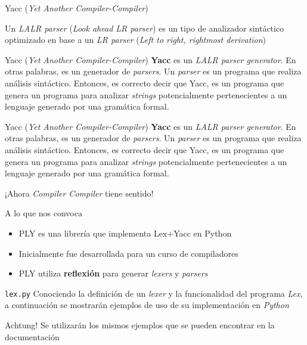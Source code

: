 \documentclass[pdf]{beamer}
\begin{document}
	\begin{frame}{Yacc (\emph{Yet Another Compiler-Compiler})}
		\begin{definition}
			Un \emph{LALR parser} (\emph{Look ahead LR parser}) es un tipo de analizador sintáctico optimizado en base a un \emph{LR parser} (\emph{Left to right, rightmost derivation})
		\end{definition}
	\end{frame}
	
	\begin{frame}{Yacc (\emph{Yet Another Compiler-Compiler})}
		\textbf{Yacc} es un \emph{LALR parser generator}. En otras palabras, es un generador de \emph{parsers}. Un \emph{parser} es un programa que realiza análisis sintáctico. Entonces, es correcto decir que Yacc, es un programa que genera un programa para analizar \emph{strings} potencialmente pertenecientes a un lenguaje generado por una gramática formal.
	\end{frame}
	
	\begin{frame}{Yacc (\emph{Yet Another Compiler-Compiler})}
		\textbf{Yacc} es un \emph{LALR parser generator}. En otras palabras, es un generador de \emph{parsers}. Un \emph{parser} es un programa que realiza análisis sintáctico. Entonces, es correcto decir que Yacc, es un programa que genera un programa para analizar \emph{strings} potencialmente pertenecientes a un lenguaje generado por una gramática formal.
		
		\medskip
		\centering
		¡Ahora \emph{Compiler Compiler} tiene sentido!
	\end{frame}
	
	\begin{frame}{A lo que nos convoca}
		\begin{itemize}
			\item PLY es una librería que implementa Lex+Yacc en Python
			\item Inicialmente fue desarrollada para un curso de compiladores
			\item PLY utiliza \textbf{reflexión} para generar \emph{lexers} y \emph{parsers}
		\end{itemize}
	\end{frame}
	
	\begin{frame}{\texttt{lex.py}}
		Conociendo la definición de un \emph{lexer} y la funcionalidad del programa \emph{Lex}, a continuación se mostrarán ejemplos de uso de su implementación en \emph{Python}
		
		\begin{alertblock}{Achtung!}
		Se utilizarán los mismos ejemplos que se pueden encontrar en la documentación	
		\end{alertblock}
	\end{frame}
	
\end{document}
